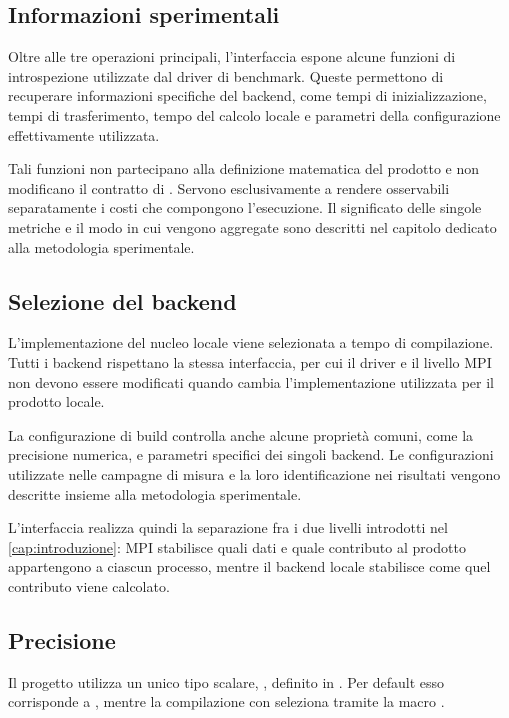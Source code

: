 \subsection{Informazioni sperimentali}

Oltre alle tre operazioni principali, l'interfaccia espone alcune funzioni
di introspezione utilizzate dal driver di benchmark. Queste permettono di
recuperare informazioni specifiche del backend, come tempi di
inizializzazione, tempi di trasferimento, tempo del calcolo locale e
parametri della configurazione effettivamente utilizzata.

Tali funzioni non partecipano alla definizione matematica del prodotto e
non modificano il contratto di . Servono esclusivamente a
rendere osservabili separatamente i costi che compongono l'esecuzione. Il
significato delle singole metriche e il modo in cui vengono aggregate sono
descritti nel capitolo dedicato alla metodologia sperimentale.

\subsection{Selezione del backend}

L'implementazione del nucleo locale viene selezionata a tempo di
compilazione. Tutti i backend rispettano la stessa interfaccia, per cui il
driver e il livello MPI non devono essere modificati quando cambia
l'implementazione utilizzata per il prodotto locale.

La configurazione di build controlla anche alcune proprietà comuni, come
la precisione numerica, e parametri specifici dei singoli backend. Le
configurazioni utilizzate nelle campagne di misura e la loro
identificazione nei risultati vengono descritte insieme alla metodologia
sperimentale.

L'interfaccia realizza quindi la separazione fra i due livelli introdotti
nel \cref{cap:introduzione}: MPI stabilisce quali dati e quale contributo
al prodotto appartengono a ciascun processo, mentre il backend locale
stabilisce come quel contributo viene calcolato.


\subsection{Precisione}\label{sec:precisione}

Il progetto utilizza un unico tipo scalare, , definito in
. Per default esso corrisponde a ,
mentre la compilazione con  seleziona  tramite
la macro .

